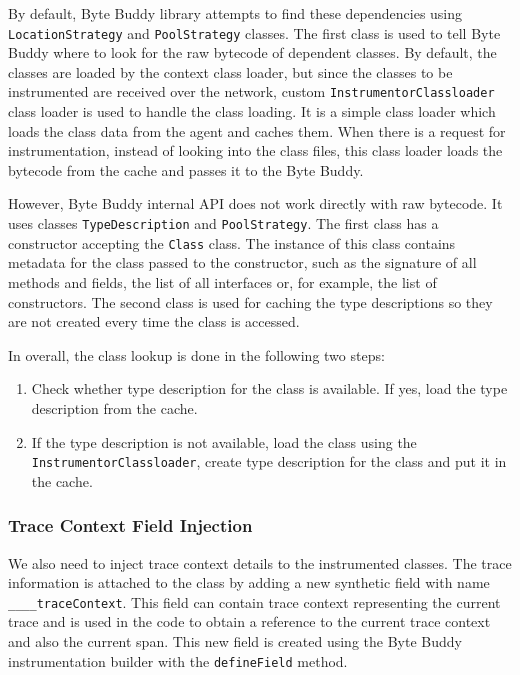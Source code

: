 By default, Byte Buddy library attempts to find these dependencies using  \texttt{LocationStrategy} and \texttt{PoolStrategy} classes. The first class is used to tell Byte Buddy where to look for the raw bytecode of dependent classes. By default, the classes are loaded by the context class loader, but since the classes to be instrumented are received over the network, custom \texttt{InstrumentorClassloader} class loader is used to handle the class loading. It is a simple class loader which loads the class data from the agent and caches them. When there is a request for instrumentation, instead of looking into the class files, this class loader loads the bytecode from the cache and passes it to the Byte Buddy.

However, Byte Buddy internal API does not work directly with raw bytecode. It uses classes \texttt{TypeDescription} and \texttt{PoolStrategy}. The first class has a constructor accepting the \texttt{Class} class. The instance of this class contains metadata for the class passed to the constructor, such as the signature of all methods and fields, the list of all interfaces or, for example, the list of constructors. The second class is used for caching the type descriptions so they are not created every time the class is accessed. 

In overall, the class lookup is done in the following two steps:
\begin{enumerate}
	\item Check whether type description for the class is available. If yes, load the type description from the cache.
	\item If the type description is not available, load the class using the \linebreak \texttt{InstrumentorClassloader}, create type description for the class and put it in the cache.
\end{enumerate}

\subsubsection{Trace Context Field Injection}
We also need to inject trace context details to the instrumented classes. The trace information is attached to the class by adding a new synthetic field with name \texttt{\_\_\_\_traceContext}. This field can contain trace context representing the current trace and is used in the code to obtain a reference to the current trace context and also the current span. This new field is created using the Byte Buddy instrumentation builder with the \texttt{defineField} method.

